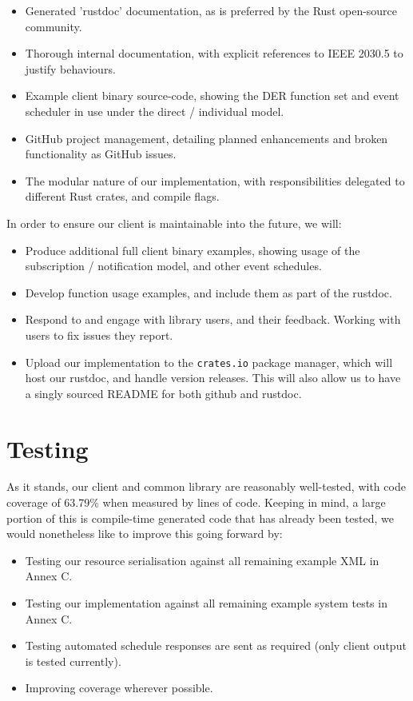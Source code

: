 \begin{itemize}
    \item Generated 'rustdoc' documentation, as is preferred by the Rust open-source community.
    \item Thorough internal documentation, with explicit references to IEEE 2030.5 to justify behaviours.
    \item Example client binary source-code, showing the DER function set and event scheduler in use under the direct / individual model.
    \item GitHub project management, detailing planned enhancements and broken functionality as GitHub issues.
    \item The modular nature of our implementation, with responsibilities delegated to different Rust crates, and compile flags.
\end{itemize}

In order to ensure our client is maintainable into the future, we will:

\begin{itemize}
    \item Produce additional full client binary examples, showing usage of the subscription / notification model, and other event schedules.
    \item Develop function usage examples, and include them as part of the rustdoc.
    \item Respond to and engage with library users, and their feedback. Working with users to fix issues they report.
    \item Upload our implementation to the \texttt{crates.io} package manager, which will host our rustdoc, and handle version releases. This will also allow us to have a singly sourced README for both github and rustdoc. 
\end{itemize}

\section{Testing}
As it stands, our client and common library are reasonably well-tested, with code coverage of 63.79\% when measured by lines of code. Keeping in mind, a large portion of this is compile-time generated code that has already been tested, we would nonetheless like to improve this going forward by:

\begin{itemize}
	\item Testing our resource serialisation against all remaining example XML in Annex C.
	\item Testing our implementation against all remaining example system tests in Annex C.
	\item Testing automated schedule responses are sent as required (only client output is tested currently).
	\item Improving coverage wherever possible.
\end{itemize}

